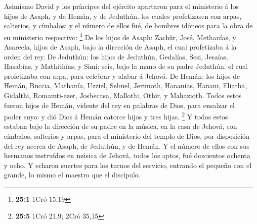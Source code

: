  Asimismo David y los príncipes del ejército apartaron para
el ministerio á los hijos de Asaph, y de Hemán, y de Jeduthún, los
cuales profetizasen con arpas, salterios, y címbalos: y el número de
ellos fué, de hombres idóneos para la obra de su ministerio respectivo:
\footnote{\textbf{25:1} 1Cró 15,19}  De los hijos de Asaph:
Zachûr, José, Methanías, y Asareela, hijos de Asaph, bajo la dirección
de Asaph, el cual profetizaba á la orden del rey.  De
Jeduthún: los hijos de Jeduthún, Gedalías, Sesi, Jesaías, Hasabías, y
Mathithías, y Simi: seis, bajo la mano de su padre Jeduthún, el cual
profetizaba con arpa, para celebrar y alabar á Jehová.  De
Hemán: los hijos de Hemán, Buccia, Mathanía, Uzziel, Sebuel, Jerimoth,
Hananías, Hanani, Eliatha, Gidalthi, Romamti-ezer, Josbecasa, Mallothi,
Othir, y Mahazioth.  Todos estos fueron hijos de Hemán,
vidente del rey en palabras de Dios, para ensalzar el poder suyo: y dió
Dios á Hemán catorce hijos y tres hijas. \footnote{\textbf{25:5} 1Cró
  21,9; 2Cró 35,15}  Y todos estos estaban bajo la dirección
de su padre en la música, en la casa de Jehová, con címbalos, salterios
y arpas, para el ministerio del templo de Dios, por disposición del rey
acerca de Asaph, de Jeduthún, y de Hemán.  Y el número de
ellos con sus hermanos instruídos en música de Jehová, todos los aptos,
fué doscientos ochenta y ocho.  Y echaron suertes para los
turnos del servicio, entrando el pequeño con el grande, lo mismo el
maestro que el discípulo.


